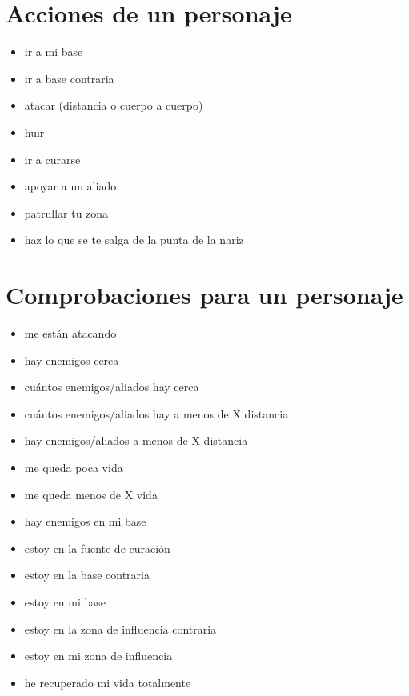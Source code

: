 \documentclass[a4paper,10pt]{article}
\begin{document}
\section{Acciones de un personaje}
\begin{itemize}
 \item ir a mi base
 \item ir a base contraria
 \item atacar (distancia o cuerpo a cuerpo)
 \item huir
 \item ir a curarse
 \item apoyar a un aliado
 \item patrullar tu zona
 \item haz lo que se te salga de la punta de la nariz
\end{itemize}


\section{Comprobaciones para un personaje}
\begin{itemize}
 \item me están atacando
 \item hay enemigos cerca
 \item cuántos enemigos/aliados hay cerca
 \item cuántos enemigos/aliados hay a menos de X distancia
 \item hay enemigos/aliados a menos de X distancia
 \item me queda poca vida
 \item me queda menos de X vida
 \item hay enemigos en mi base
 \item estoy en la fuente de curación
 \item estoy en la base contraria
 \item estoy en mi base
 \item estoy en la zona de influencia contraria
 \item estoy en mi zona de influencia
 \item he recuperado mi vida totalmente
\end{itemize}
\end{document}
